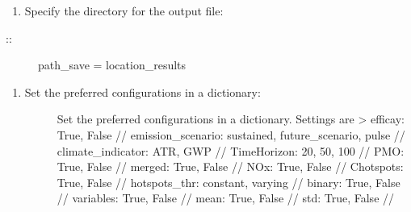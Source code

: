 \documentclass[a4paper,11pt,english]{sphinxmanual}
\begin{document}
\begin{sphinxVerbatim}[commandchars=\\\{\}]
     
\end{sphinxVerbatim}
\begin{enumerate}
%
\setcounter{enumi}{2}
\item {} 
Specify the directory for the output file:

\end{enumerate}
\begin{description}
\item[{::}] \leavevmode
path\_save = location\_results

\end{description}
\begin{enumerate}
%
\setcounter{enumi}{3}
\item {} \begin{description}
\item[{Set the preferred configurations in a dictionary:}] \leavevmode
Set the preferred configurations in a dictionary. Settings are \textendash{}\textgreater{}
efficay: True, False //
emission\_scenario: sustained, future\_scenario, pulse //
climate\_indicator: ATR, GWP //
TimeHorizon: 20, 50, 100 //
PMO: True, False //
merged: True, False //
NOx: True, False //
Chotspots: True, False //
hotspots\_thr: constant, varying //
binary: True, False //
variables: True, False //
mean: True, False //
std: True, False //

\end{description}

\end{enumerate}
\end{document}
